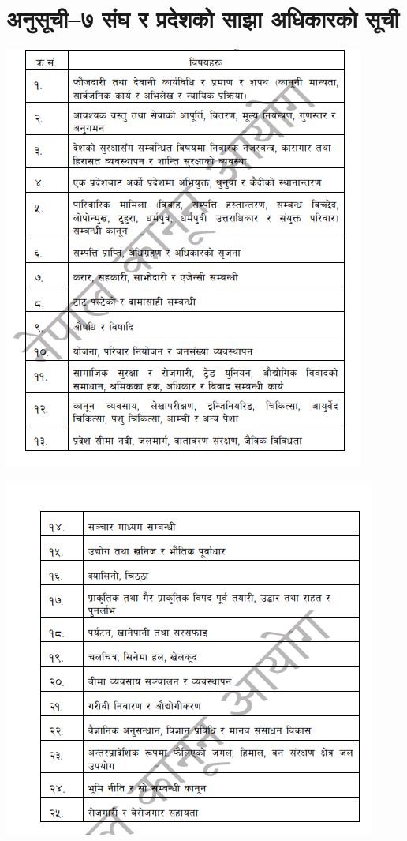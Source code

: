 \section{अनुसूची–७ संघ र प्रदेशको साझा अधिकारको सूची}

\includegraphics[width=\textwidth]{images/42-1.png}

\includegraphics[width=\textwidth]{images/42-2.png}